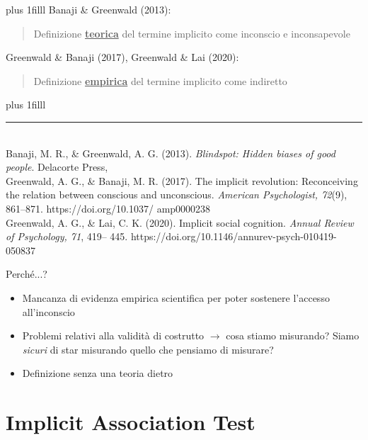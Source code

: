 \documentclass[compress]{beamer}
\begin{document}
\begin{frame}
	\vskip0pt plus 1filll
	Banaji \& Greenwald (2013): 
	
	\vspace{5mm}
	\begin{quote}
		Definizione \underline{\textbf{teorica}} del termine implicito come inconscio e inconsapevole
	\end{quote}

\vspace{5mm}
Greenwald \& Banaji (2017), Greenwald \& Lai (2020): 

\vspace{5mm}
\begin{quote}
	
	Definizione \underline{\textbf{empirica}} del termine implicito come indiretto 

\end{quote}
\vskip0pt plus 1filll

\color{template}\rule{0.30\linewidth}{0.5pt}\\
\color{black}
\scriptsize{Banaji, M. R., \& Greenwald, A. G. (2013). \emph{Blindspot:
	Hidden biases of good people}. Delacorte Press,\\ 
Greenwald, A. G., \& Banaji, M. R. (2017). The
implicit revolution: Reconceiving the relation
between conscious and unconscious. \emph{American Psychologist, 72}(9), 861–871. https://doi.org/10.1037/
amp0000238\\
Greenwald, A. G., \& Lai, C. K. (2020). Implicit social
cognition. \emph{Annual Review of Psychology, 71}, 419–
445. https://doi.org/10.1146/annurev-psych-010419-
050837
}
\end{frame}

\begin{frame}{Perché...?}
	\begin{itemize}
		\item Mancanza di evidenza empirica scientifica per poter sostenere l'accesso all'inconscio 
		\item Problemi relativi alla validità di costrutto $\rightarrow$ cosa stiamo misurando? Siamo \emph{sicuri} di star misurando quello che pensiamo di misurare?  
		\item Definizione senza una teoria dietro 
	\end{itemize}
\end{frame}

\section[IAT]{Implicit Association Test}
\end{document}
